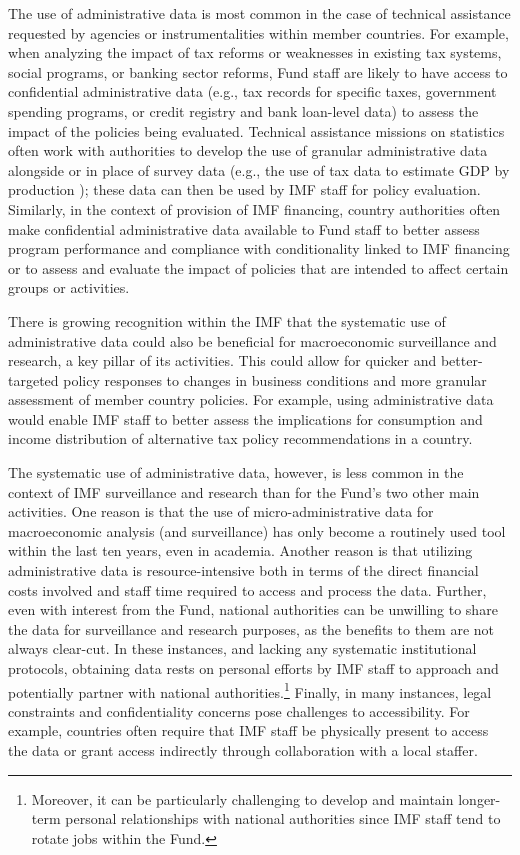 The use of administrative data is most common in the case of technical assistance requested by agencies or instrumentalities within member countries. For example, when analyzing the impact of tax reforms or weaknesses in existing tax systems, social programs, or banking sector reforms, Fund staff are likely to have access to confidential administrative data (e.g., tax records for specific taxes, government spending programs, or credit registry and bank loan-level data) to assess the impact of the policies being evaluated. Technical assistance missions on statistics often work with authorities to develop the use of granular administrative data alongside or in place of survey data (e.g., the use of tax data to estimate GDP by production \citep{rivas2018}); these data can then be used by IMF staff for policy evaluation. Similarly, in the context of provision of IMF financing, country authorities often make confidential administrative data available to Fund staff to better assess program performance and compliance with conditionality linked to IMF financing or to assess and evaluate the impact of policies that are intended to affect certain groups or activities.

There is growing recognition within the IMF that the systematic use of administrative data could also be beneficial for macroeconomic surveillance and research, a key pillar of its activities. This could allow for quicker and better-targeted policy responses to changes in business conditions and more granular assessment of member country policies. For example, using administrative data would enable IMF staff to better assess the implications for consumption and income distribution of alternative tax policy recommendations in a country.

The systematic use of administrative data, however, is less common in the context of IMF surveillance and research than for the Fund's two other main activities. One reason is that the use of micro-administrative data for macroeconomic analysis (and surveillance) has only become a routinely used tool within the last ten years, even in academia. Another reason is that utilizing administrative data is resource-intensive both in terms of the direct financial costs involved and staff time required to access and process the data. Further, even with interest from the Fund, national authorities can be unwilling to share the data for surveillance and research purposes, as the benefits to them are not always clear-cut. In these instances, and lacking any systematic institutional protocols, obtaining data rests on personal efforts by IMF staff to approach and potentially partner with national authorities.\footnote{Moreover, it can be particularly challenging to develop and maintain longer-term personal relationships with national authorities since IMF staff tend to rotate jobs within the Fund.} Finally, in many instances, legal constraints and confidentiality concerns pose challenges to accessibility. For example, countries often require that IMF staff be physically present to access the data or grant access indirectly through collaboration with a local staffer.

